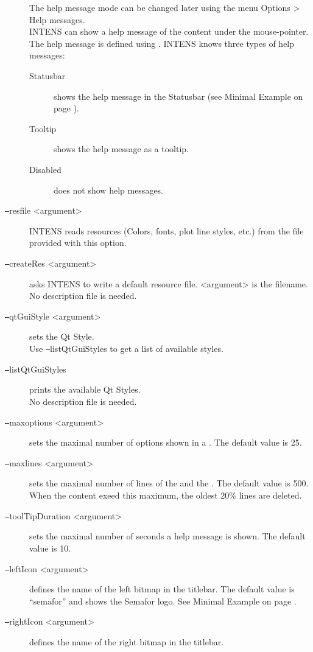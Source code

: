 \begin{description}
  The help message mode can be changed later using the menu Options > Help messages. \\
  INTENS can show a help message of the content under the mouse-pointer. The help message is defined
  using \HELPTEXT.
  INTENS knows three types of help messages:
  \begin{description}
  \item[Statusbar] shows the help message in the Statusbar
  (see Minimal Example on page \pageref{fig:minimalExample}).
  \item[Tooltip] shows the help message as a tooltip.
  \item[Disabled] does not show help messages.
  \end{description}
%
\item[\texttt{--}resfile <argument>]
  INTENS reads resources (Colors, fonts, plot line styles, etc.) from the file
  provided with this option.
%
\item[\texttt{--}createRes <argument>] asks INTENS to write a default resource file.
  <argument> is the filename. \\
  No description file is needed.
%
%
\item[\texttt{--}qtGuiStyle <argument>] sets the Qt Style. \\
  Use \texttt{--}listQtGuiStyles to get a list of available styles.
%
\item[\texttt{--}listQtGuiStyles] prints the available Qt Styles. \\
  No description file is needed.
%
\item[\texttt{--}maxoptions <argument>] sets the maximal number of options shown in a \COMBOBOX.
  The default value is 25.
%
\item[\texttt{--}maxlines <argument>] sets the maximal number of lines of the \LOGWINDOW{} and the \STDWINDOW{}.
  The default value is 500.
  When the content exeed this maximum, the oldest 20\% lines are deleted.
%
\item[\texttt{--}toolTipDuration <argument>] sets the maximal number of seconds a help message is shown.
  The default value is 10.
%
\item[\texttt{--}leftIcon <argument>] defines the name of the left bitmap in the titlebar.
  The default value is ``semafor'' and shows the Semafor logo.
  See Minimal Example on page \pageref{fig:minimalExample}.
%
\item[\texttt{--}rightIcon <argument>] defines the name of the right bitmap in the titlebar.

\end{description}
